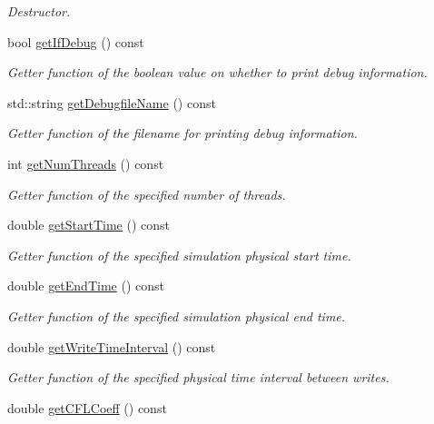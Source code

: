 \begin{DoxyCompactItemize}
\begin{DoxyCompactList}\small\item\em Destructor. \end{DoxyCompactList}\item 
bool \hyperlink{classInitializer_a34db3aa329d059001e7debc85615ebf7}{get\-If\-Debug} () const 
\begin{DoxyCompactList}\small\item\em Getter function of the boolean value on whether to print debug information. \end{DoxyCompactList}\item 
std\-::string \hyperlink{classInitializer_a8453e187009cff7a59a915c80b2ddcf9}{get\-Debugfile\-Name} () const 
\begin{DoxyCompactList}\small\item\em Getter function of the filename for printing debug information. \end{DoxyCompactList}\item 
int \hyperlink{classInitializer_a4dcf0bde88ac4546d5bd514ccee9edd9}{get\-Num\-Threads} () const 
\begin{DoxyCompactList}\small\item\em Getter function of the specified number of threads. \end{DoxyCompactList}\item 
double \hyperlink{classInitializer_a9ceaeef9151ef04eec9869d87ef72fc9}{get\-Start\-Time} () const 
\begin{DoxyCompactList}\small\item\em Getter function of the specified simulation physical start time. \end{DoxyCompactList}\item 
double \hyperlink{classInitializer_a1ae812ddd69f72689ed6d09c86d9aeb7}{get\-End\-Time} () const 
\begin{DoxyCompactList}\small\item\em Getter function of the specified simulation physical end time. \end{DoxyCompactList}\item 
double \hyperlink{classInitializer_acae2ad876640dcf42d52ebe7d0ca3603}{get\-Write\-Time\-Interval} () const 
\begin{DoxyCompactList}\small\item\em Getter function of the specified physical time interval between writes. \end{DoxyCompactList}\item 
double \hyperlink{classInitializer_a8a279957aac13e582142bc90701e873d}{get\-C\-F\-L\-Coeff} () const 

\end{DoxyCompactItemize}
